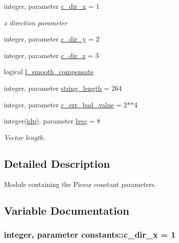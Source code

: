 \begin{DoxyCompactItemize}
integer, parameter \hyperlink{namespaceconstants_a8e38e74e9723ce351e7a20787e649e89}{c\+\_\+dir\+\_\+x} = 1
\begin{DoxyCompactList}\small\item\em x direction parameter \end{DoxyCompactList}\item 
integer, parameter \hyperlink{namespaceconstants_a5d84bc6ed2e3bd7b6e64704dc587825b}{c\+\_\+dir\+\_\+y} = 2
\item 
integer, parameter \hyperlink{namespaceconstants_a9d2fa70332164d956c148a895e769983}{c\+\_\+dir\+\_\+z} = 3
\item 
logical \hyperlink{namespaceconstants_a91e41f33367410db88a66890aae444cc}{l\+\_\+smooth\+\_\+compensate}
\item 
integer, parameter \hyperlink{namespaceconstants_a6082bfa433cfb27d3f80d0f32b278570}{string\+\_\+length} = 264
\item 
integer, parameter \hyperlink{namespaceconstants_a0c96dab545557ad23bf55d7576f5405f}{c\+\_\+err\+\_\+bad\+\_\+value} = 2$\ast$$\ast$4
\item 
integer(\hyperlink{namespaceconstants_ae345db51770e3628e6aaf76e6a45e160}{idp}), parameter \hyperlink{namespaceconstants_a68354913203e3e01c9b0b547e9d95aae}{lvec} = 8
\begin{DoxyCompactList}\small\item\em Vector length. \end{DoxyCompactList}\end{DoxyCompactItemize}


\subsection{Detailed Description}
Module containing the Picsar constant parameters. 

\subsection{Variable Documentation}
\subsubsection[{\texorpdfstring{c\+\_\+dir\+\_\+x}{c_dir_x}}]{\setlength{\rightskip}{0pt plus 5cm}integer, parameter constants\+::c\+\_\+dir\+\_\+x = 1}\hypertarget{namespaceconstants_a8e38e74e9723ce351e7a20787e649e89}{}\label{namespaceconstants_a8e38e74e9723ce351e7a20787e649e89}


